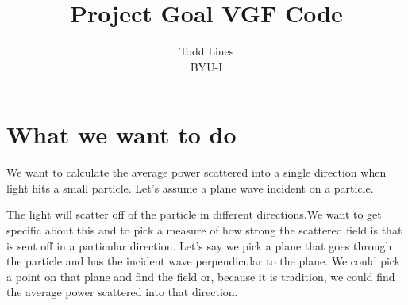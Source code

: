 \documentclass{article}
\begin{document}
\title{Project Goal VGF Code}
\author{Todd Lines \\
BYU-I}
\maketitle

\section{What we want to do}

We want to calculate the average power scattered into a single direction
when light hits a small particle. Let's assume a plane wave incident on a
particle.

The light will scatter off of the
particle in different directions.We want to get specific about
this and to pick a measure of how strong the scattered field is that is sent
off in a particular direction. Let's say we pick a plane that goes through
the particle and has the incident wave perpendicular to the plane. We could
pick a point on that plane and find the field or, because it is tradition,
we could find the average power scattered into that direction.
\end{document}

